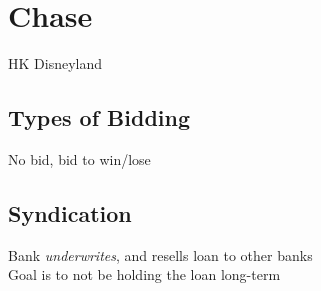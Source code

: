 \section{Chase}
	HK Disneyland
	\subsection*{Types of Bidding}
	No bid, bid to win/lose
	
	\subsection*{Syndication}
	Bank \emph{underwrites}, and resells loan to other banks\\
	Goal is to not be holding the loan long-term
